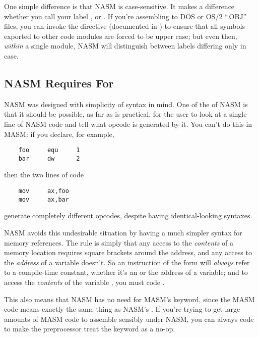 One simple difference is that NASM is case-sensitive. It makes a
difference whether you call your label ,  or
. If you're assembling to DOS or OS/2 ``.OBJ'' files,
you can invoke the  directive (documented in
) to ensure that all symbols exported to other
code modules are forced to be upper case; but even then, \emph{within}
a single module, NASM will distinguish between labels differing only
in case.

\subsection{NASM Requires  For }
\label{subsec:qsbrackets}

NASM was designed with simplicity of syntax in mind. One of the
 of NASM is that it should be possible,
as far as is practical, for the user to look at a single line of
NASM code and tell what opcode is generated by it. You can't do
this in MASM: if you declare, for example,

\begin{lstlisting}
	foo     equ     1
	bar     dw      2
\end{lstlisting}

then the two lines of code

\begin{lstlisting}
	mov     ax,foo
	mov     ax,bar
\end{lstlisting}

generate completely different opcodes, despite having
identical-looking syntaxes.

NASM avoids this undesirable situation by having a much simpler
syntax for memory references. The rule is simply that any access to
the \emph{contents} of a memory location requires square brackets
around the address, and any access to the \emph{address} of a variable
doesn't. So an instruction of the form  will
\emph{always} refer to a compile-time constant, whether it's an 
or the address of a variable; and to access the \emph{contents} of the
variable , you must code .

This also means that NASM has no need for MASM's 
keyword, since the MASM code  means exactly the
same thing as NASM's . If you're trying to get
large amounts of MASM code to assemble sensibly under NASM, you
can always code  to make the preprocessor
treat the  keyword as a no-op.

